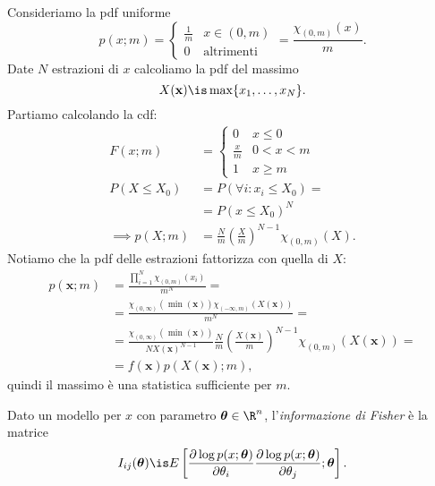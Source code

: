 
\begin{example}
	\label{th:unifmaxpdf}
	Consideriamo la pdf uniforme
	\begin{equation*}
		p(x;m) = \begin{cases}
			\frac1m & x\in(0,m) \\
			0 & \text{altrimenti}
		\end{cases}
		= \frac{\chi_{(0,m)}(x)}m.
	\end{equation*}
	Date $N$ estrazioni di $x$ calcoliamo la pdf del massimo
	\begin{equation*}
		X(\mathbf x) \is \max\{x_1,\dotsc,x_N\}.
	\end{equation*}
	Partiamo calcolando la cdf:
	\begin{align*}
		F(x;m) &= \begin{cases}
			0 & x \le 0 \\
			\frac xm & 0 < x < m \\
			1 & x \ge m
		\end{cases} \\
		P(X\le X_0)
		&= P(\forall i:x_i\le X_0) = \\
		&= P(x \le X_0)^N \\
		\implies
		p(X;m) &= \frac Nm \left( \frac Xm \right)^{N-1} \chi_{(0,m)}(X).
	\end{align*}
	Notiamo che la pdf delle estrazioni fattorizza con quella di $X$:
	\begin{align*}
		p(\mathbf x;m)
		&= \frac{\prod_{i=1}^N \chi_{(0,m)}(x_i)}{m^N} = \\
		&= \frac{\chi_{(0,\infty)}(\min(\mathbf x))\chi_{(-\infty,m)}(X(\mathbf x))}{m^N} = \\
		&= \frac{\chi_{(0,\infty)}(\min(\mathbf x))}{N X(\mathbf x)^{N-1}}
		\frac Nm \left( \frac{X(\mathbf x)}m \right)^{N-1} \chi_{(0,m)}(X(\mathbf x)) = \\
		&= f(\mathbf x) p(X(\mathbf x);m),
	\end{align*}
	quindi il massimo è una statistica sufficiente per $m$.
\end{example}


\begin{definition}
	Dato un modello per $x$ con parametro $\boldsymbol\theta\in\R^n$,
	l'\emph{informazione di Fisher} è la matrice
	\begin{equation*}
		I_{ij}(\boldsymbol\theta) \is E \left[
		\frac{\partial\log p(x;\boldsymbol\theta)}{\partial\theta_i}
		\frac{\partial\log p(x;\boldsymbol\theta)}{\partial\theta_j};\boldsymbol\theta \right].
	\end{equation*}
\end{definition}

